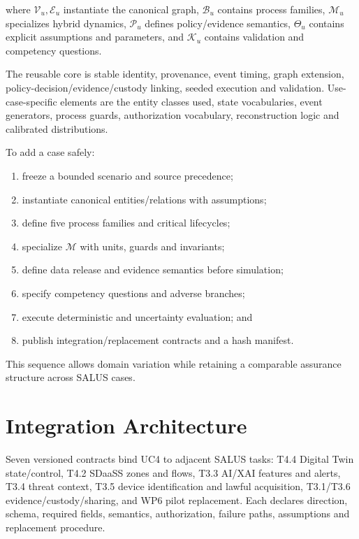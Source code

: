﻿\documentclass[10pt,a4paper,twocolumn]{article}
\begin{document}
where \(\mathcal{V}_u,\mathcal{E}_u\) instantiate the canonical graph, \(\mathcal{B}_u\) contains process families, \(\mathcal{M}_u\) specializes hybrid dynamics, \(\mathcal{P}_u\) defines policy/evidence semantics, \(\Theta_u\) contains explicit assumptions and parameters, and \(\mathcal{K}_u\) contains validation and competency questions.

The reusable core is stable identity, provenance, event timing, graph extension, policy-decision/evidence/custody linking, seeded execution and validation. Use-case-specific elements are the entity classes used, state vocabularies, event generators, process guards, authorization vocabulary, reconstruction logic and calibrated distributions.

To add a case safely:

\begin{enumerate}
  \item freeze a bounded scenario and source precedence;
  \item instantiate canonical entities/relations with assumptions;
  \item define five process families and critical lifecycles;
  \item specialize \(\mathcal{M}\) with units, guards and invariants;
  \item define data release and evidence semantics before simulation;
  \item specify competency questions and adverse branches;
  \item execute deterministic and uncertainty evaluation; and
  \item publish integration/replacement contracts and a hash manifest.
\end{enumerate}

This sequence allows domain variation while retaining a comparable assurance structure across SALUS cases.

\section{Integration Architecture}

Seven versioned contracts bind UC4 to adjacent SALUS tasks: T4.4 Digital Twin state/control, T4.2 SDaaSS zones and flows, T3.3 AI/XAI features and alerts, T3.4 threat context, T3.5 device identification and lawful acquisition, T3.1/T3.6 evidence/custody/sharing, and WP6 pilot replacement. Each declares direction, schema, required fields, semantics, authorization, failure paths, assumptions and replacement procedure.
\end{document}
